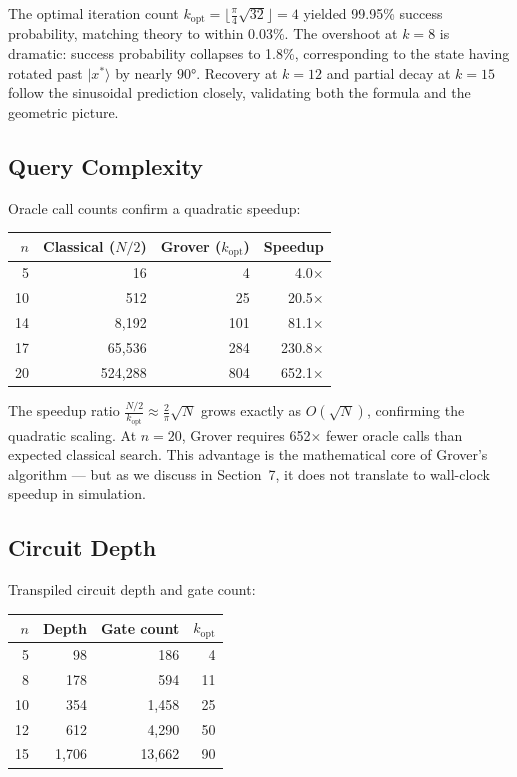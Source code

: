 \documentclass[sigconf, authorversion=true, nonacm=true]{acmart}
\begin{document}
The optimal iteration count $k_{\text{opt}} = \lfloor\frac{\pi}{4}\sqrt{32}\rfloor = 4$ yielded 99.95\% success probability, matching theory to within 0.03\%. The overshoot at $k=8$ is dramatic: success probability collapses to 1.8\%, corresponding to the state having rotated past $|x^*\rangle$ by nearly $90°$. Recovery at $k=12$ and partial decay at $k=15$ follow the sinusoidal prediction closely, validating both the formula and the geometric picture.

\subsection{Query Complexity}

Oracle call counts confirm a quadratic speedup:

\begin{center}
\begin{tabular}{rrrr}
\toprule
$n$ & Classical ($N/2$) & Grover ($k_{\text{opt}}$) & Speedup \\
\midrule
5  & 16       & 4       & 4.0$\times$ \\
10 & 512      & 25      & 20.5$\times$ \\
14 & 8,192    & 101     & 81.1$\times$ \\
17 & 65,536   & 284     & 230.8$\times$ \\
20 & 524,288  & 804     & 652.1$\times$ \\
\bottomrule
\end{tabular}
\end{center}

The speedup ratio $\frac{N/2}{k_{\text{opt}}} \approx \frac{2}{\pi}\sqrt{N}$ grows exactly as $O(\sqrt{N})$, confirming the quadratic scaling. At $n=20$, Grover requires 652$\times$ fewer oracle calls than expected classical search. This advantage is the mathematical core of Grover's algorithm — but as we discuss in Section~7, it does not translate to wall-clock speedup in simulation.

\subsection{Circuit Depth}

Transpiled circuit depth and gate count:

\begin{center}
\begin{tabular}{rrrr}
\toprule
$n$ & Depth & Gate count & $k_{\text{opt}}$ \\
\midrule
5  & 98    & 186    & 4  \\
8  & 178   & 594    & 11 \\
10 & 354   & 1,458  & 25 \\
12 & 612   & 4,290  & 50 \\
15 & 1,706 & 13,662 & 90 \\
\bottomrule
\end{tabular}
\end{center}
\end{document}
